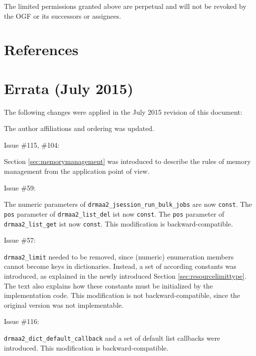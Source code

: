 \documentclass{article}
\newcommand{\h}[1]{\texttt{#1}}
\newcommand{\rat}[1]{}
\begin{document}
 The limited permissions granted above are perpetual and will not be
 revoked by the OGF or its successors or assignees.


\section{References}
\renewcommand{\refname}{}
\vspace*{-3em}


\newpage
\appendix

\section{Errata (July 2015)}
\label{sec:errata}

The following changes were applied in the July 2015 revision of this document:

The author affiliations and ordering was updated.

Issue \#115, \#104:

Section \ref{sec:memorymanagement} was introduced to describe the rules of memory management from the application point of view.

Issue \#59:

The numeric parameters of \lstinline{drmaa2_jsession_run_bulk_jobs} are now \lstinline{const}. The \lstinline{pos} parameter of \lstinline{drmaa2_list_del} ist now \lstinline{const}. The \lstinline{pos} parameter of \lstinline{drmaa2_list_get} ist now \lstinline{const}. This modification is backward-compatible.

Issue \#57:

\lstinline{drmaa2_limit} needed to be removed, since (numeric) enumeration members cannot become keys in dictionaries. Instead, a set of according constants was introduced, as explained in the newly introduced Section \ref{sec:resourcelimittype}. The text also explains how these constants must be initialized by the implementation code. This modification is not backward-compatible, since the original version was not implementable.

\rat{The issue text further discusses why the extern const approach was favoured over a simple macro definition. The main reason is convinience for C++ people.}

Issue \#116:

\h{drmaa2\_dict\_default\_callback} and a set of default list callbacks were introduced. This modification is backward-compatible.
\end{document}
